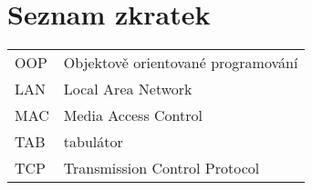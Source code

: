 \section*{Seznam zkratek}
\vspace{2em}

\noindent
\begin{tabular}{@{}ll@{}}
OOP	&	Objektově orientované programování\\
LAN	&	Local Area Network\\
MAC	&	Media Access Control\\
TAB	&	tabulátor \\
TCP	&	Transmission Control Protocol
\end{tabular}

